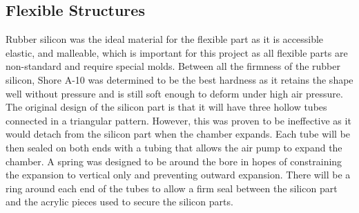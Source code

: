 \documentclass[twoside, 11pt]{article}
\begin{document}
\subsection{Flexible Structures}
Rubber silicon was the ideal material for the flexible part as it is accessible elastic, and malleable, which is important for this project as all flexible parts are non-standard and require special molds. Between all the firmness of the rubber silicon, Shore A-10 was determined to be the best hardness as it retains the shape well without pressure and is still soft enough to deform under high air pressure. The original design of the silicon part is that it will have three hollow tubes connected in a triangular pattern. However, this was proven to be ineffective as it would detach from the silicon part when the chamber expands. Each tube will be then sealed on both ends with a tubing that allows the air pump to expand the chamber. A spring was designed to be around the bore in hopes of constraining the expansion to vertical only and preventing outward expansion. There will be a ring around each end of the tubes to allow a firm seal between the silicon part and the acrylic pieces used to secure the silicon parts.  
\end{document}
